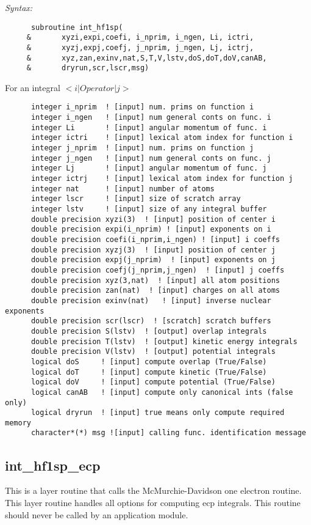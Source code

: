 {\it Syntax:} 
\begin{verbatim} 
      subroutine int_hf1sp( 
     &       xyzi,expi,coefi, i_nprim, i_ngen, Li, ictri, 
     &       xyzj,expj,coefj, j_nprim, j_ngen, Lj, ictrj, 
     &       xyz,zan,exinv,nat,S,T,V,lstv,doS,doT,doV,canAB, 
     &       dryrun,scr,lscr,msg) 
\end{verbatim} 
For an integral $<i|Operator|j>$ 
\begin{verbatim} 
      integer i_nprim  ! [input] num. prims on function i 
      integer i_ngen   ! [input] num general conts on func. i 
      integer Li       ! [input] angular momentum of func. i   
      integer ictri    ! [input] lexical atom index for function i  
      integer j_nprim  ! [input] num. prims on function j      
      integer j_ngen   ! [input] num general conts on func. j  
      integer Lj       ! [input] angular momentum of func. j   
      integer ictrj    ! [input] lexical atom index for function j  
      integer nat      ! [input] number of atoms 
      integer lscr     ! [input] size of scratch array 
      integer lstv     ! [input] size of any integral buffer 
      double precision xyzi(3)  ! [input] position of center i 
      double precision expi(i_nprim) ! [input] exponents on i 
      double precision coefi(i_nprim,i_ngen) ! [input] i coeffs 
      double precision xyzj(3)  ! [input] position of center j 
      double precision expj(j_nprim)  ! [input] exponents on j 
      double precision coefj(j_nprim,j_ngen)  ! [input] j coeffs 
      double precision xyz(3,nat)  ! [input] all atom positions 
      double precision zan(nat)  ! [input] charges on all atoms 
      double precision exinv(nat)   ! [input] inverse nuclear exponents 
      double precision scr(lscr)  ! [scratch] scratch buffers 
      double precision S(lstv)  ! [output] overlap integrals 
      double precision T(lstv)  ! [output] kinetic energy integrals 
      double precision V(lstv)  ! [output] potential integrals 
      logical doS     ! [input] compute overlap (True/False) 
      logical doT     ! [input] compute kinetic (True/False) 
      logical doV     ! [input] compute potential (True/False) 
      logical canAB   ! [input] compute only canonical ints (false only) 
      logical dryrun  ! [input] true means only compute required memory 
      character*(*) msg ![input] calling func. identification message 
\end{verbatim} 
\subsection{int\_hf1sp\_ecp} 
This is a layer routine that calls the  
McMurchie-Davidson one electron routine.  This layer 
routine handles all options for computing ecp integrals. 
This routine should never be called by an application module. 
 
